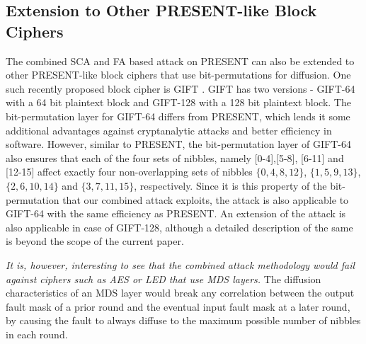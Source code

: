 \documentclass[10pt, conference, compsocconf]{IEEEtran}  %
\numberwithin{Definition}{section}
\numberwithin{Claim}{section}
\begin{document}
\subsection{Extension to Other PRESENT-like Block Ciphers}

The combined SCA and FA based attack on PRESENT can also be extended to other PRESENT-like block ciphers that use bit-permutations for diffusion. One such recently proposed block cipher is GIFT \cite{gift}. GIFT has two versions - GIFT-64 with a 64 bit plaintext block and GIFT-128 with a 128 bit plaintext block. The bit-permutation layer for GIFT-64 differs from PRESENT, which lends it some additional advantages against cryptanalytic attacks and better efficiency in software. However, similar to PRESENT, the bit-permutation layer of GIFT-64 also ensures that each of the four sets of nibbles, namely [0-4],[5-8], [6-11] and [12-15] affect exactly four non-overlapping sets of nibbles $\{0,4,8,12\}$, $\{1,5,9,13\}$, $\{2,6,10,14\}$ and $\{3,7,11,15\}$, respectively. Since it is this property of the bit-permutation that our combined attack exploits, the attack is also applicable to GIFT-64 with the same efficiency as PRESENT. An extension of the attack is also applicable in case of GIFT-128, although a detailed description of the same is beyond the scope of the current paper. 

\emph{It is, however, interesting to see that the combined attack methodology would fail against ciphers such as AES or LED that use MDS layers.} The diffusion characteristics of an MDS layer would break any correlation between the output fault mask of a prior round and the eventual input fault mask at a later round, by causing the fault to always diffuse to the maximum possible number of nibbles in each round. 



\end{document}
